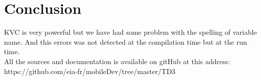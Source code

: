 \documentclass[a4paper,10pt]{article}
\begin{document}
				\section{Conclusion}	
				KVC is very powerful but we have had some problem with the spelling of variable name. And this errors was not detected at the compilation time but at the run time.\\
				All the sources and documentation is available on gitHub at this address: \\ https://github.com/eia-fr/mobileDev/tree/master/TD3
\end{document}
